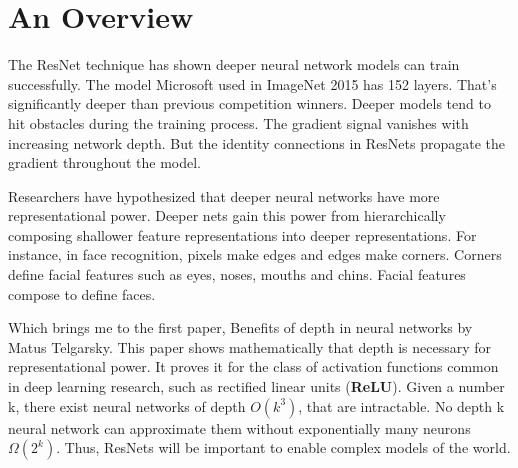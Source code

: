 \documentclass[12pt]{article}
\numberwithin{equation}{section}
\numberwithin{table}{section}
\numberwithin{figure}{section}
\begin{document}
%

\section{An Overview}

The ResNet technique has shown deeper neural network models can train successfully. The model Microsoft used in ImageNet 2015 has 152 layers. That’s significantly deeper than previous competition winners. Deeper models tend to hit obstacles during the training process. The gradient signal vanishes with increasing network depth. But the identity connections in ResNets propagate the gradient throughout the model.

Researchers have hypothesized that deeper neural networks have more representational power. Deeper nets gain this power from hierarchically composing shallower feature representations into deeper representations. For instance, in face recognition, pixels make edges and edges make corners. Corners define facial features such as eyes, noses, mouths and chins. Facial features compose to define faces.

Which brings me to the first paper, Benefits of depth in neural networks by Matus Telgarsky. This paper shows mathematically that depth is necessary for representational power. It proves it for the class of activation functions common in deep learning research, such as rectified linear units (\textbf{ReLU}). Given a number k, there exist neural networks of depth $O(k^3)$, that are intractable. No depth k neural network can approximate them without exponentially many neurons $Ω(2^k)$. Thus, ResNets will be important to enable complex models of the world.
\end{document}
